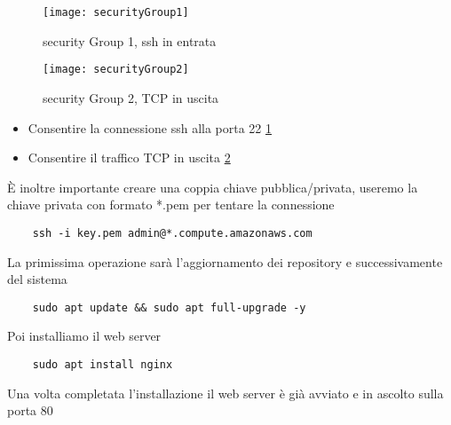 \begin{figure}
    \centering
    \texttt{[image: securityGroup1]}
    \caption{security Group 1, ssh in entrata}
    \label{fig:sec1}
\end{figure}

\begin{figure}
    \centering
    \texttt{[image: securityGroup2]}
    \caption{security Group 2, TCP in uscita}
    \label{fig:sec2}
\end{figure}

\begin{itemize}
    \item Consentire la connessione ssh alla porta 22 \ref{fig:sec1}
    \item Consentire il traffico TCP in uscita \ref{fig:sec2}
\end{itemize}

È inoltre importante creare una coppia chiave pubblica/privata, useremo la chiave privata con formato *.pem per tentare la connessione
\begin{lstlisting}
    ssh -i key.pem admin@*.compute.amazonaws.com
\end{lstlisting}

La primissima operazione sarà l'aggiornamento dei repository e successivamente del sistema
\begin{lstlisting}
    sudo apt update && sudo apt full-upgrade -y
\end{lstlisting}

Poi installiamo il web server
\begin{lstlisting}
    sudo apt install nginx
\end{lstlisting}

Una volta completata l'installazione il web server è già avviato e in ascolto sulla porta 80

